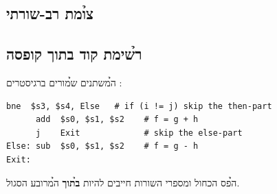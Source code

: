 \subsection*{\h{צומת רב-שורתי}}
\begin{tikzpic}
\end{tikzpic}

\subsection*{\h{רשימת קוד בתוך קופסה}}
\begin{exbox}[frametitle={\h{דוגמה} — \code{if (i==j) f=g+h; else f=g-h;}}]
\h{המשתנים}  \h{שמורים ברגיסטרים} :
\begin{asmblock}
\begin{lstlisting}[style=asm]
      bne  $s3, $s4, Else   # if (i != j) skip the then-part
      add  $s0, $s1, $s2    # f = g + h
      j    Exit             # skip the else-part
Else: sub  $s0, $s1, $s2    # f = g - h
Exit:
\end{lstlisting}
\end{asmblock}
\h{הפס הכחול ומספרי השורות חייבים להיות} \textbf{\h{בתוך}} \h{המרובע הסגול.}
\end{exbox}

